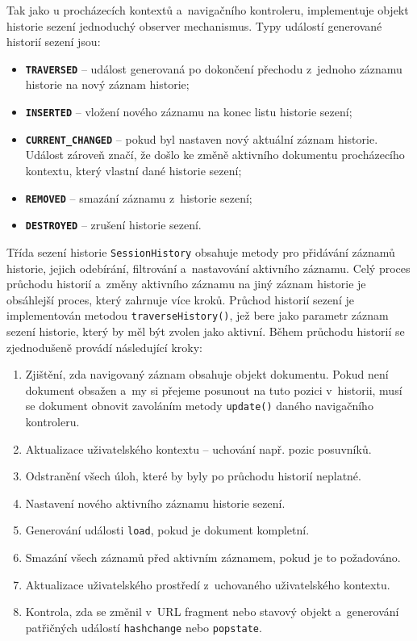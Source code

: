 Tak jako u procházecích kontextů a~navigačního kontroleru, implementuje objekt historie sezení jednoduchý observer mechanismus. Typy událostí generované historií sezení jsou:

\begin{itemize}
  \item \textbf{\texttt{TRAVERSED}} -- událost generovaná po dokončení přechodu z~jednoho záznamu historie na nový záznam historie;
  \item \textbf{\texttt{INSERTED}} -- vložení nového záznamu na konec listu historie sezení;
  \item \textbf{\texttt{CURRENT\_CHANGED}} -- pokud byl nastaven nový aktuální záznam historie. Událost zároveň značí, že došlo ke změně aktivního dokumentu procházecího kontextu, který vlastní dané historie sezení; 
  \item \textbf{\texttt{REMOVED}} -- smazání záznamu z~historie sezení;
  \item \textbf{\texttt{DESTROYED}} -- zrušení historie sezení.
\end{itemize}

Třída sezení historie \texttt{SessionHistory} obsahuje metody pro přidávání záznamů historie, jejich odebírání, filtrování a~nastavování aktivního záznamu. Celý proces průchodu historií a~změny aktivního záznamu na jiný záznam historie je obsáhlejší proces, který zahrnuje více kroků. Průchod historií sezení je implementován metodou \texttt{traverseHistory()}, jež bere jako parametr záznam sezení historie, který by měl být zvolen jako aktivní. Během průchodu historií se zjednodušeně provádí následující kroky:

\begin{enumerate}
  \item Zjištění, zda navigovaný záznam obsahuje objekt dokumentu. Pokud není dokument obsažen a~my si přejeme posunout na tuto pozici v~historii, musí se dokument obnovit zavoláním metody \texttt{update()} daného navigačního kontroleru.
  \item Aktualizace uživatelského kontextu -- uchování např. pozic posuvníků.
  \item Odstranění všech úloh, které by byly po průchodu historií neplatné.
  \item Nastavení nového aktivního záznamu historie sezení.
  \item Generování události \texttt{load}, pokud je dokument kompletní.
  \item Smazání všech záznamů před aktivním záznamem, pokud je to požadováno.
  \item Aktualizace uživatelského prostředí z~uchovaného uživatelského kontextu.
  \item Kontrola, zda se změnil v~URL fragment nebo stavový objekt a~generování patřičných událostí \texttt{hashchange} nebo \texttt{popstate}.
\end{enumerate}

